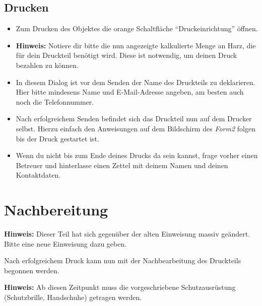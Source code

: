 \documentclass{\basedir/fablab-document}
\begin{document}
\subsection{Drucken}
\begin{itemize}

    \item Zum Drucken des Objektes die orange Schaltfläche \enquote{Druckeinrichtung} öffnen.\\
    \item \textbf{Hinweis:} Notiere dir bitte die nun angezeigte kalkulierte Menge an Harz, die für dein Druckteil benötigt wird. Diese ist notwendig, um deinen Druck bezahlen zu können.
    \item In diesem Dialog ist vor dem Senden der Name des Druckteils zu deklarieren. Hier bitte mindesens Name und E-Mail-Adresse angeben, am besten auch noch die Telefonnummer.\\
    \item Nach erfolgreichem Senden befindet sich das Druckteil nun auf dem Drucker selbst. Hierzu einfach den Anweisungen auf dem Bildschirm des \textit{Form2} folgen bis der Druck gestartet ist.
    \item Wenn du nicht bis zum Ende deines Drucks da sein kannst, frage vorher einen Betreuer und hinterlasse einen Zettel mit deinem Namen und deinen Kontaktdaten.

\end{itemize}

\pagebreak


\section{Nachbereitung}

\textbf{Hinweis:} Dieser Teil hat sich gegenüber der alten Einweisung massiv geändert. Bitte eine neue Einweisung dazu geben. 

Nach erfolgreichem Druck kann nun mit der Nachbearbeitung des Druckteils begonnen werden.

\textbf{Hinweis:} Ab diesen Zeitpunkt muss die vorgeschriebene Schutzausrüstung (Schutzbrille, Handschuhe) getragen werden.
\end{document}
